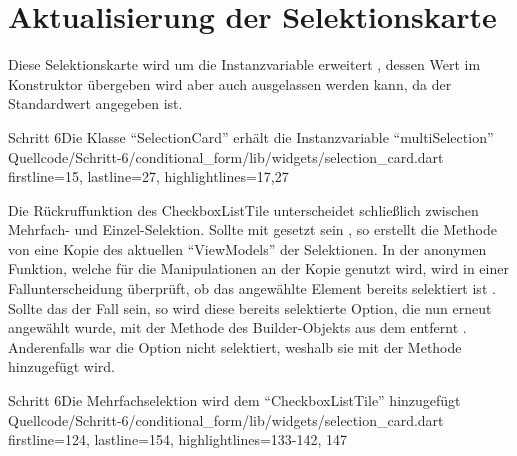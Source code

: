 \section{Aktualisierung der Selektionskarte}


Diese Selektionskarte wird um die Instanzvariable  erweitert ,
dessen Wert im Konstruktor übergeben wird  aber auch ausgelassen werden kann, da der Standardwert  angegeben ist.

\begin{alexlisting}{Schritt 6}{Die Klasse \enquote{SelectionCard} erhält die Instanzvariable \enquote{multiSelection}}
  {Quellcode/Schritt-6/conditional_form/lib/widgets/selection_card.dart}
  {firstline=15, lastline=27, highlightlines={17,27}}
  \label{lst:Schritt6SelectionCard}
\end{alexlisting}


Die Rückruffunktion  des CheckboxListTile unterscheidet schließlich zwischen Mehrfach- und Einzel-Selektion.
Sollte  mit  gesetzt sein , so erstellt die Methode  von  eine Kopie des aktuellen \enquote{ViewModels} der Selektionen.
In der anonymen Funktion,
welche für die Manipulationen an der Kopie genutzt wird,
wird in einer Fallunterscheidung überprüft,
ob das angewählte Element bereits selektiert ist .
Sollte das der Fall sein,
so wird diese bereits selektierte Option, die nun erneut angewählt wurde, mit der Methode  des Builder-Objekts aus dem  entfernt .
Anderenfalls war die Option nicht selektiert, weshalb sie mit der Methode  hinzugefügt wird. 


\begin{alexlisting}{Schritt 6}{Die Mehrfachselektion wird dem \enquote{CheckboxListTile} hinzugefügt }
  {Quellcode/Schritt-6/conditional_form/lib/widgets/selection_card.dart}
  {firstline=124, lastline=154, highlightlines={133-142, 147}}
  \label{lst:Schritt6XXXX}
\end{alexlisting}